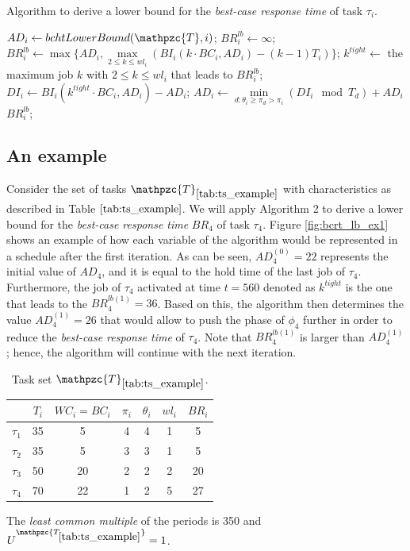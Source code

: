 \documentclass[fleqn]{article}
\begin{document}
\begin{algorithm}[H]
	\caption{Algorithm to derive a lower bound for the \textit{best-case response time} of task $\tau_i$.}\label{euclid}
	\begin{algorithmic}[1]
		\State $AD_i \gets bchtLowerBound(\mathpzc{T},i)$;
		\State $BR^{lb}_i \gets \infty$;
		\State $BR^{lb}_i \gets \max\{ AD_i, \max \limits_{2 \leq k \leq wl_i} (BI_i(k \cdot BC_i, AD_i) - (k-1)T_i) \}$;
		\State $k^{tight} \gets$ the maximum job $k$ with $2 \leq k \leq wl_i$ that leads to $BR^{lb}_i$;
		\State $DI_i \gets BI_i(k^{tight} \cdot BC_i, AD_i) - AD_i$;
		\State $AD_i \gets \min \limits_{d:\theta_i \geq \pi_d > \pi_i} (DI_i \mod T_d) + AD_i$
		\State \Return $BR^{lb}_i$; 
		\EndProcedure
	\end{algorithmic}
\end{algorithm}

\subsection{An example}
Consider the set of tasks $\mathpzc{T}_{\ref{tab:ts_example}}$ with characteristics as described in Table $\ref{tab:ts_example}$. We will apply Algorithm 2 to derive a lower bound for the \textit{best-case response time} $BR_4$ of task $\tau_4$. Figure \ref{fig:bcrt_lb_ex1} shows an example of how each variable of the algorithm would be represented in a schedule after the first iteration. As can be seen, $AD^{(0)}_4=22$ represents the initial value of $AD_4$, and it is equal to the hold time of the last job of $\tau_4$. Furthermore, the job of $\tau_4$ activated at time $t=560$ denoted as $k^{tight}$ is the one that leads to the $BR^{lb (1)}_4=36$. Based on this, the algorithm then determines the value $AD^{(1)}_4=26$ that would allow to push the phase of $\phi_4$ further in order to reduce the \textit{best-case response time} of $\tau_4$. Note that $BR^{lb (1)}_4$ is larger than $AD^{(1)}_4$; hence, the algorithm will continue with the next iteration.

\begin{table}[H]
	\center
	\caption{Task set $\mathpzc{T}_{\ref{tab:ts_example}}$.}
	\label{tab:ts_example}
	\begin{tabular}{c c c c c | c c}
		\hline 
		& $T_i$ & $WC_i=BC_i$ & $\pi_i$ & $\theta_i$ &  $wl_i$ & $BR_i$\\ 
		\hline 
		$\tau_1$& 35 & 5  & 4 & 4 &  1 & 5\\ 
		$\tau_2$& 35 & 5  & 3 & 3 &  1 & 5\\ 
		$\tau_3$& 50 & 20 & 2 & 2 &  2 & 20\\ 
		$\tau_4$& 70 & 22 & 1 & 2 &  5 & 27\\
		\hline 
	\end{tabular}
	\small
	\item The \textit{least common multiple} of the periods is 350 and $U^{\mathpzc{T_{\ref{tab:ts_example}}}}=1$.
\end{table}
\end{document}
